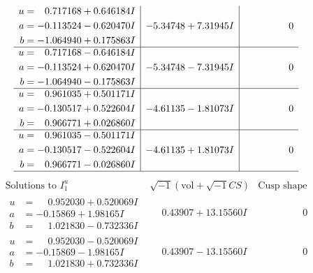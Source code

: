 \documentclass[1p]{elsarticle_modified}
\theoremstyle{definition}
\newcommand{\I}{\sqrt{-1}}
\begin{document}
$$\begin{array}{c|c|c}
\begin{aligned}
u &= \phantom{-}0.717168 + 0.646184 I \\
a &= -0.113524 - 0.620470 I \\
b &= -1.064940 + 0.175863 I\end{aligned}
 & -5.34748 + 7.31945 I & \phantom{-0.000000 } 0 \\ \hline\begin{aligned}
u &= \phantom{-}0.717168 - 0.646184 I \\
a &= -0.113524 + 0.620470 I \\
b &= -1.064940 - 0.175863 I\end{aligned}
 & -5.34748 - 7.31945 I & \phantom{-0.000000 } 0 \\ \hline\begin{aligned}
u &= \phantom{-}0.961035 + 0.501171 I \\
a &= -0.130517 + 0.522604 I \\
b &= \phantom{-}0.966771 + 0.026860 I\end{aligned}
 & -4.61135 - 1.81073 I & \phantom{-0.000000 } 0 \\ \hline\begin{aligned}
u &= \phantom{-}0.961035 - 0.501171 I \\
a &= -0.130517 - 0.522604 I \\
b &= \phantom{-}0.966771 - 0.026860 I\end{aligned}
 & -4.61135 + 1.81073 I & \phantom{-0.000000 } 0\\
 \hline 
 \end{array}$$\newpage$$\begin{array}{c|c|c}  
\text{Solutions to }I^u_{1}& \I (\text{vol} + \sqrt{-1}CS) & \text{Cusp shape}\\
 \hline 
\begin{aligned}
u &= \phantom{-}0.952030 + 0.520069 I \\
a &= -0.15869 + 1.98165 I \\
b &= \phantom{-}1.021830 - 0.732336 I\end{aligned}
 & \phantom{-}0.43907 + 13.15560 I & \phantom{-0.000000 } 0 \\ \hline\begin{aligned}
u &= \phantom{-}0.952030 - 0.520069 I \\
a &= -0.15869 - 1.98165 I \\
b &= \phantom{-}1.021830 + 0.732336 I\end{aligned}
 & \phantom{-}0.43907 - 13.15560 I & \phantom{-0.000000 } 0 \\ \hline\begin{aligned}

\end{aligned}
\end{array}$$
\end{document}
